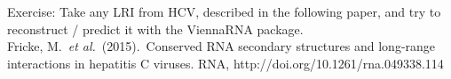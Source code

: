 \begin{frame}[c]{}
  \begin{block}{Exercise:}
    Take any LRI from HCV, described in the following paper, and try to reconstruct / predict it with the ViennaRNA package.\\[2em]
    \tiny{Fricke, M.~\textit{et al.}~(2015).~Conserved RNA secondary structures and long-range interactions in hepatitis C viruses. RNA, http://doi.org/10.1261/rna.049338.114}%
  \end{block}
\end{frame}

\beginbackup


\backupend

